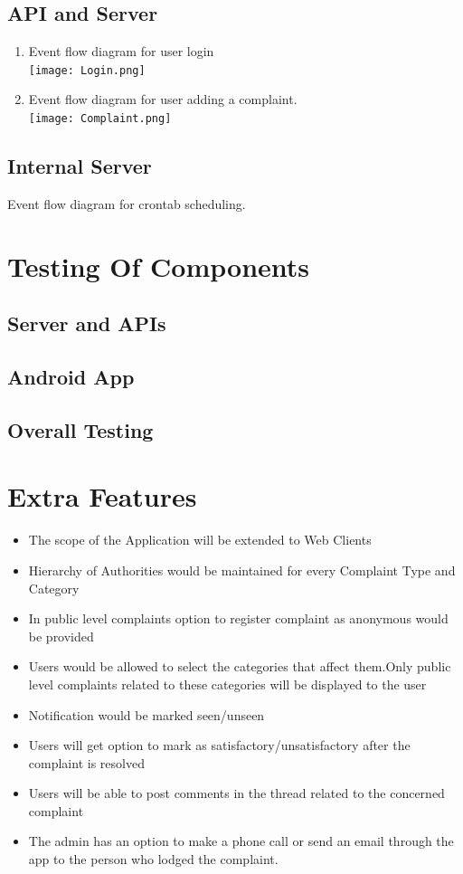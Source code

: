 \documentclass{article}
\begin{document}
			\subsection{API and Server}
			\begin{enumerate}
				\item Event flow diagram for user login \\
					\texttt{[image: Login.png]} \\
				\item Event flow diagram for user adding a complaint. \\
					\texttt{[image: Complaint.png]}
			\end{enumerate}
			\subsection{Internal Server}
				Event flow diagram for crontab scheduling.

	
	\section{Testing Of Components}
			\subsection{Server and APIs}
			\subsection{Android App}
			\subsection{Overall Testing}
	
	\section{Extra Features}
	\begin{itemize}
	\item The scope of the Application will be extended to Web Clients
	\item Hierarchy of Authorities would be maintained for every Complaint Type and Category
	\item In public level complaints option to register complaint as anonymous would be provided
	\item Users would be allowed to select the categories that affect them.Only public level complaints related to these categories will be displayed to the user
	\item Notification would be marked seen/unseen
	\item Users will get option to mark as satisfactory/unsatisfactory after the complaint is resolved
	\item Users will be able to post comments in the thread related to the concerned complaint
	\item The admin has an option to make a phone call or send an email through the app to the person who lodged the complaint.
	\end{itemize}
\end{document}
